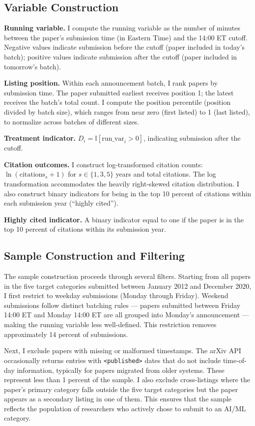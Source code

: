 \documentclass[12pt]{article}
\newcommand{\ind}{\mathbb{I}}
\begin{document}
\subsection{Variable Construction}

\textbf{Running variable.} I compute the running variable as the number of minutes between the paper's submission time (in Eastern Time) and the 14:00 ET cutoff. Negative values indicate submission before the cutoff (paper included in today's batch); positive values indicate submission after the cutoff (paper included in tomorrow's batch).

\textbf{Listing position.} Within each announcement batch, I rank papers by submission time. The paper submitted earliest receives position 1; the latest receives the batch's total count. I compute the position percentile (position divided by batch size), which ranges from near zero (first listed) to 1 (last listed), to normalize across batches of different sizes.

\textbf{Treatment indicator.} $D_i = \ind[\text{run\_var}_i > 0]$, indicating submission after the cutoff.

\textbf{Citation outcomes.} I construct log-transformed citation counts: $\ln(\text{citations}_{s} + 1)$ for $s \in \{1, 3, 5\}$ years and total citations. The log transformation accommodates the heavily right-skewed citation distribution. I also construct binary indicators for being in the top 10 percent of citations within each submission year (``highly cited'').

\textbf{Highly cited indicator.} A binary indicator equal to one if the paper is in the top 10 percent of citations within its submission year.

\subsection{Sample Construction and Filtering}

The sample construction proceeds through several filters. Starting from all papers in the five target categories submitted between January 2012 and December 2020, I first restrict to weekday submissions (Monday through Friday). Weekend submissions follow distinct batching rules --- papers submitted between Friday 14:00 ET and Monday 14:00 ET are all grouped into Monday's announcement --- making the running variable less well-defined. This restriction removes approximately 14 percent of submissions.

Next, I exclude papers with missing or malformed timestamps. The arXiv API occasionally returns entries with \texttt{<published>} dates that do not include time-of-day information, typically for papers migrated from older systems. These represent less than 1 percent of the sample. I also exclude cross-listings where the paper's primary category falls outside the five target categories but the paper appears as a secondary listing in one of them. This ensures that the sample reflects the population of researchers who actively chose to submit to an AI/ML category.
\end{document}
